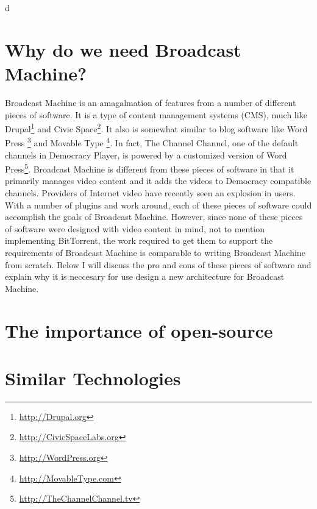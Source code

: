 d\documentclass[a4paper,12pt]{report}
\begin{document}
\section {Why do we need Broadcast Machine?}
	Broadcast Machine is an amagalmation of features from a number of different pieces of software.
It is a type of content management systems (CMS), much like Drupal\footnote{\url{http://Drupal.org}} and Civic Space\footnote{\url{http://CivicSpaceLabs.org}}.
It also is somewhat similar to blog software like Word Press \footnote{\url{http://WordPress.org}} and Movable Type \footnote{\url{http://MovableType.com}}. 
In fact, The Channel Channel, one of the default channels in Democracy Player, is powered by a customized version of Word Press\footnote{\url{http://TheChannelChannel.tv}}. 
Broadcast Machine is different from these pieces of software in that it primarily manages video content and it adds the videos to Democracy compatible channels. 
Providers of Internet video have recently seen an explosion in users. 
With a number of plugins and work around, each of these pieces of software could accomplish the goals of Broadcast Machine.
However, since none of these pieces of software were designed with video content in mind, not to mention implementing BitTorrent, the work required to get them to support the requirements of Broadcast Machine is comparable to writing Broadcast Machine from scratch.
Below I will discuss the pro and cons of these pieces of software and explain why it is neccesary for use design a new architecture for Broadcast Machine.

\section {The importance of open-source}

\section {Similar Technologies}
\end{document}
